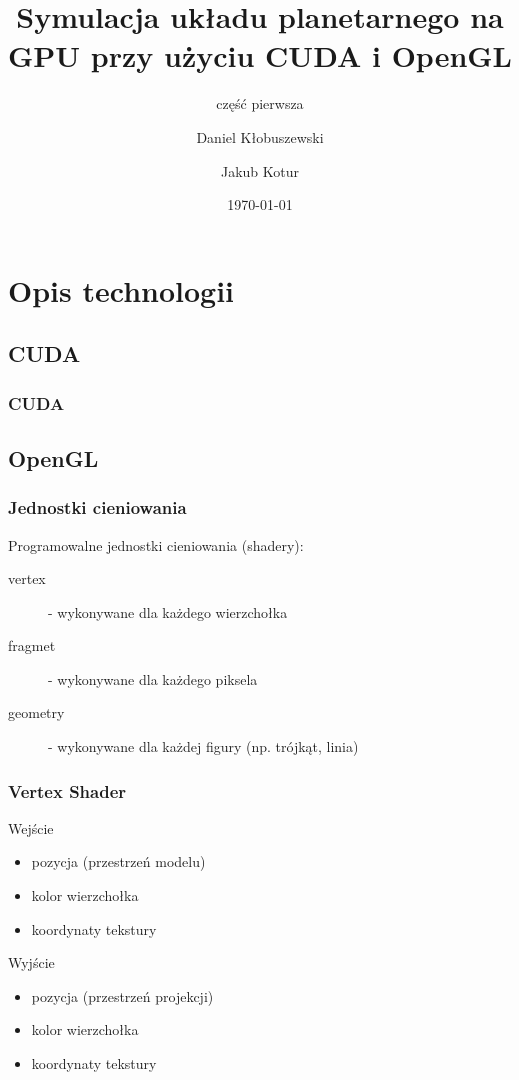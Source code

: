 \documentclass{beamer}
\title{Symulacja układu planetarnego na GPU przy użyciu CUDA i OpenGL}
\subtitle{część pierwsza}
\author{Daniel Kłobuszewski\and Jakub Kotur}
\institute{Politechnika Warszawska}
\date{\today}
\begin{document}
\frame[plain]{\titlepage}


\section{Opis technologii}\label{sec:opis technologii}


\subsection{CUDA}\label{sub:cuda}

\frame
{
	\frametitle{CUDA}
}

\subsection{OpenGL}\label{sub:opengl}

\frame
{
	\frametitle{Jednostki cieniowania}

	Programowalne jednostki cieniowania (shadery):

	\begin{description}
	\item[vertex] - wykonywane dla każdego wierzchołka
	\item[fragmet] - wykonywane dla każdego piksela
	\pause
	\item[geometry] - wykonywane dla każdej figury (np. trójkąt, linia)
	\end{description}

}

\frame
{
	\frametitle{Vertex Shader}
	\begin{block}{Wejście}
	\begin{itemize}
	\item pozycja (przestrzeń modelu)
	\item kolor wierzchołka
	\item koordynaty tekstury
	\end{itemize}
	\end{block}
	\begin{block}{Wyjście}
	\begin{itemize}
	\item pozycja (przestrzeń projekcji)
	\item kolor wierzchołka
	\item koordynaty tekstury
	\end{itemize}
	\end{block}
}
\end{document}
